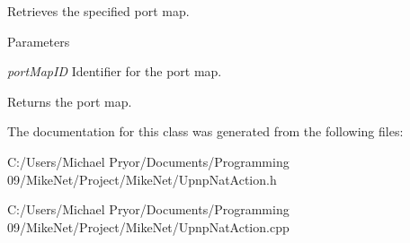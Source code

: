 Retrieves the specified port map. 


\begin{DoxyParams}{Parameters}
\item[{\em portMapID}]Identifier for the port map.\end{DoxyParams}
\begin{DoxyReturn}{Returns}
the port map. 
\end{DoxyReturn}


The documentation for this class was generated from the following files:\begin{DoxyCompactItemize}
\item 
C:/Users/Michael Pryor/Documents/Programming 09/MikeNet/Project/MikeNet/UpnpNatAction.h\item 
C:/Users/Michael Pryor/Documents/Programming 09/MikeNet/Project/MikeNet/UpnpNatAction.cpp\end{DoxyCompactItemize}
